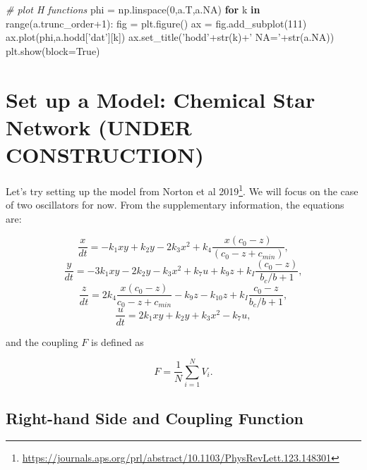 \documentclass[english,a4paper,oneside]{article}
\newenvironment{Shaded}{}{}
\newcommand{\BuiltInTok}[1]{#1}
\newcommand{\CommentTok}[1]{\textcolor[rgb]{0.38,0.63,0.69}{\textit{#1}}}
\newcommand{\ControlFlowTok}[1]{\textcolor[rgb]{0.00,0.44,0.13}{\textbf{#1}}}
\newcommand{\DecValTok}[1]{\textcolor[rgb]{0.25,0.63,0.44}{#1}}
\newcommand{\KeywordTok}[1]{\textcolor[rgb]{0.00,0.44,0.13}{\textbf{#1}}}
\newcommand{\NormalTok}[1]{#1}
\newcommand{\OperatorTok}[1]{\textcolor[rgb]{0.40,0.40,0.40}{#1}}
\newcommand{\StringTok}[1]{\textcolor[rgb]{0.25,0.44,0.63}{#1}}
\newcommand{\VariableTok}[1]{\textcolor[rgb]{0.10,0.09,0.49}{#1}}
\DeclareRobustCommand{\href}[2]{#2\footnote{\url{#1}}}
\begin{document}
\begin{Shaded}
\begin{Highlighting}[]
    \CommentTok{# plot H functions}
\NormalTok{    phi }\OperatorTok{=}\NormalTok{ np.linspace(}\DecValTok{0}\NormalTok{,a.T,a.NA)}
    \ControlFlowTok{for}\NormalTok{ k }\KeywordTok{in} \BuiltInTok{range}\NormalTok{(a.trunc_order}\OperatorTok{+}\DecValTok{1}\NormalTok{):}
\NormalTok{        fig }\OperatorTok{=}\NormalTok{ plt.figure()}
\NormalTok{        ax }\OperatorTok{=}\NormalTok{ fig.add_subplot(}\DecValTok{111}\NormalTok{)}
\NormalTok{        ax.plot(phi,a.hodd[}\StringTok{'dat'}\NormalTok{][k])}
\NormalTok{        ax.set_title(}\StringTok{'hodd'}\OperatorTok{+}\BuiltInTok{str}\NormalTok{(k)}\OperatorTok{+}\StringTok{' NA='}\OperatorTok{+}\BuiltInTok{str}\NormalTok{(a.NA))}
\NormalTok{        plt.show(block}\OperatorTok{=}\VariableTok{True}\NormalTok{)}
\end{Highlighting}
\end{Shaded}

\hypertarget{set-up-a-model-chemical-star-network-under-construction}{%
\section{Set up a Model: Chemical Star Network (UNDER
CONSTRUCTION)}\label{set-up-a-model-chemical-star-network-under-construction}}

Let's try setting up the model from
\href{https://journals.aps.org/prl/abstract/10.1103/PhysRevLett.123.148301}{Norton
et al 2019}. We will focus on the case of two oscillators for now. From
the supplementary information, the equations are:

\[\frac{x}{dt} = -k_1xy + k_2 y - 2k_3 x^2 + k_4\frac{x(c_0-z)}{(c_0-z+c_{min})},\]
\[\frac{y}{dt} = -3k_1xy - 2k_2y - k_3x^2 + k_7 u + k_9 z + k_I \frac{(c_0-z)}{b_c/b+1},\]
\[\frac{z}{dt} = 2k_4 \frac{x(c_0-z)}{c_0 -z+c_{min}} - k_9 z - k_{10} z + k_I \frac{c_0 - z}{b_c/b+1},\]
\[\frac{u}{dt} = 2k_1 xy + k_2y + k_3 x^2 - k_7 u,\]

and the coupling \(F\) is defined as

\[F = \frac{1}{N}\sum_{i=1}^N V_i.\]

\hypertarget{right-hand-side-and-coupling-function-1}{%
\subsection{Right-hand Side and Coupling
Function}\label{right-hand-side-and-coupling-function-1}}
\end{document}
